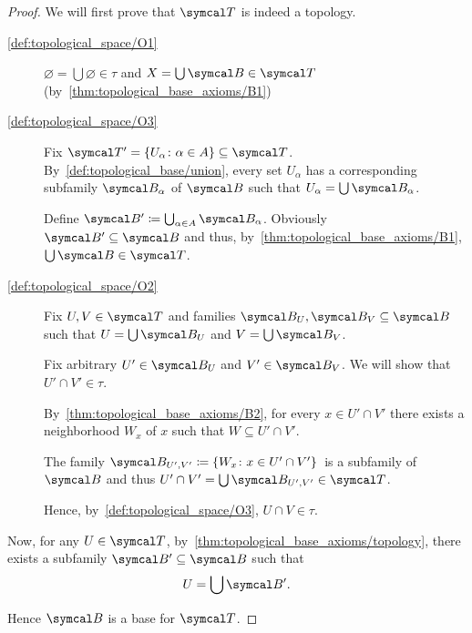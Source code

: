 \begin{proof}
  We will first prove that \( \Cal{T} \) is indeed a topology.

  \begin{description}
    \item[\ref{def:topological_space/O1}] \( \varnothing = \bigcup \varnothing \in \tau \) and \( X = \bigcup \Cal{B} \in \Cal{T} \) (by~\ref{thm:topological_base_axioms/B1})

    \item[\ref{def:topological_space/O3}] Fix \( \Cal{T}' = \{ U_\alpha \colon \alpha \in A \} \subseteq \Cal{T} \). By~\cref{def:topological_base/union}, every set \( U_\alpha \) has a corresponding subfamily \( \Cal{B}_\alpha \) of \( \Cal{B} \) such that \( U_\alpha = \bigcup \Cal{B}_\alpha \).

    Define \( \Cal{B}' \coloneqq \bigcup_{\alpha \in A} \Cal{B}_\alpha \). Obviously \( \Cal{B}' \subseteq \Cal{B} \) and thus, by~\ref{thm:topological_base_axioms/B1}, \( \bigcup \Cal{B} \in \Cal{T} \).

    \item[\ref{def:topological_space/O2}] Fix \( U, V \in \Cal{T} \) and families \( \Cal{B}_U, \Cal{B}_V \subseteq \Cal{B} \) such that \( U = \bigcup \Cal{B}_U \) and \( V = \bigcup \Cal{B}_V \).

    Fix arbitrary \( U' \in \Cal{B}_U \) and \( V' \in \Cal{B}_V \). We will show that \( U' \cap V' \in \tau \).

    By~\ref{thm:topological_base_axioms/B2}, for every \( x \in U' \cap V' \) there exists a neighborhood \( W_x \) of \( x \) such that \( W \subseteq U' \cap V' \).

    The family \( \Cal{B}_{U',V'} \coloneqq \{ W_x \colon x \in U' \cap V' \} \)~\AOC is a subfamily of \( \Cal{B} \) and thus \( U' \cap V' = \bigcup \Cal{B}_{U',V'} \in \Cal{T} \).

    Hence, by~\ref{def:topological_space/O3}, \( U \cap V \in \tau \).
  \end{description}

  Now, for any \( U \in \Cal{T} \), by~\cref{thm:topological_base_axioms/topology}, there exists a subfamily \( \Cal{B}' \subseteq \Cal{B} \) such that
  \begin{align*}
    U = \bigcup \Cal{B}'.
  \end{align*}

  Hence \( \Cal{B} \) is a base for \( \Cal{T} \).
\end{proof}

